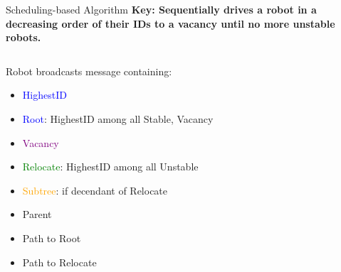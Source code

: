 \begin{frame}{Scheduling-based Algorithm}
  \textbf{\small{Key: Sequentially drives a robot in a decreasing order of their IDs to a vacancy until no more unstable robots.}}
  \begin{columns}[T] %
    \begin{column}{.5\textwidth}
      \small{
        Robot broadcasts message containing:
        \begin{itemize}
        \item \textcolor{blue}{HighestID} 
        \item \textcolor{blue}{Root}: HighestID among all Stable, Vacancy
        \item \textcolor{purple}{Vacancy}
        \item \textcolor{green}{Relocate}: HighestID among all Unstable 
        \item \textcolor{orange}{Subtree}: if decendant of Relocate
        \item Parent 
        \item Path to Root
        \item Path to Relocate
        \end{itemize}
      }
    \end{column}%
    \begin{column}{.4\textwidth}
      
    \end{column}%
  \end{columns}
\end{frame}